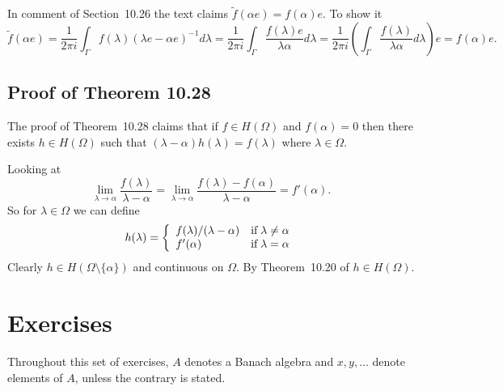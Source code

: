In comment  of Section~10.26 the text claims
\(\tilde{f}(\alpha e) = f(\alpha)e\). To show it
\begin{equation*}
\tilde{f}(\alpha e)
  = \frac{1}{2\pi i}\int_{\Gamma} f(\lambda)(\lambda e - \alpha e)^{-1} d\lambda
  = \frac{1}{2\pi i}\int_{\Gamma} \frac{f(\lambda)e}{\lambda \alpha} d\lambda
  = \frac{1}{2\pi i}
    \left(\int_{\Gamma} \frac{f(\lambda)}{\lambda \alpha} d\lambda\right)e
  = f(\alpha)e.
\end{equation*}

\subsection{Proof of Theorem 10.28}

The proof of Theorem~10.28 claims that if
\(f\in H(\Omega)\) and \(f(\alpha)=0\)
then there exists \(h\in H(\Omega)\) such that
\((\lambda - \alpha)h(\lambda) = f(\lambda)\) where \(\lambda\in\Omega\).

Looking at
\begin{equation*}
\lim_{\lambda\to\alpha} \frac{f(\lambda)}{\lambda - \alpha}
= \lim_{\lambda\to\alpha} \frac{f(\lambda) - f(\alpha)}{\lambda - \alpha}
= f'(\alpha).
\end{equation*}
So for \(\lambda\in \Omega\) we can define
\begin{equation*}
h(\lambda) = \left\{
\begin{array}{ll}
 f(\lambda)/(\lambda - \alpha) & \textnormal{if}\;\lambda \neq \alpha \\
 f'(\alpha) &                    \textnormal{if}\;\lambda = \alpha \\
\end{array}
\right.
\end{equation*}
Clearly \(h\in H(\Omega\setminus\{\alpha\})\) and continuous on \(\Omega\).
By Theorem~10.20 of \cite{RudinRCA80} \(h\in H(\Omega)\).

\section{Exercises} %

Throughout this set of exercises,
$A$ denotes a Banach algebra and \(x, y, \ldots\) denote
elements of $A$, unless the contrary is stated.

